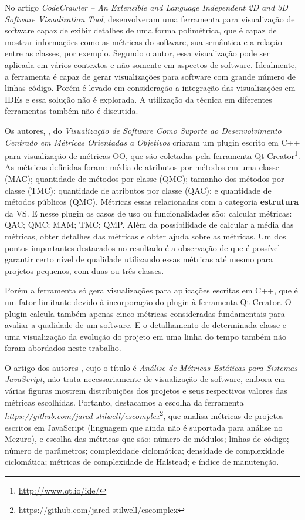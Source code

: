 No artigo \textit{CodeCrawler – An Extensible and Language Independent 2D and
3D Software Visualization Tool}, 
desenvolveram uma ferramenta para visualização de software capaz de exibir
detalhes de uma forma polimétrica, que é capaz de mostrar informações como as
métricas do software, sua semântica e a relação entre as classes, por exemplo.
Segundo o autor, essa visualização pode ser aplicada em vários contextos e não
somente em aspectos de software. Idealmente, a ferramenta é capaz de gerar
visualizações para software com grande número de linhas código. Porém é levado
em consideração a integração das visualizações em IDEs e essa solução não é
explorada. A utilização da técnica em diferentes ferramentas também não é
discutida.

Os autores, , do \textit{Visualização de Software
Como Suporte ao Desenvolvimento Centrado em Métricas Orientadas a Objetivos}
criaram um plugin escrito em C++ para visualização de métricas OO, que são
coletadas pela ferramenta Qt Creator\footnote{\url{http://www.qt.io/ide/}}. As
métricas definidas foram: média de atributos por métodos em uma classe (MAC);
quantidade de métodos por classe (QMC); tamanho dos métodos por classe (TMC);
quantidade de atributos por classe (QAC); e quantidade de métodos públicos
(QMC). Métricas essas relacionadas com a categoria \textbf{estrutura} da VS.
E nesse plugin os casos de uso ou funcionalidades
são: calcular métricas: QAC; QMC; MAM; TMC; QMP. Além da
possibilidade de calcular a média das métricas, obter detalhes das métricas e
obter ajuda sobre as métricas. Um dos pontos importantes destacados no
resultado é a observação de que é possível garantir certo nível de qualidade
utilizando essas métricas até mesmo para projetos pequenos, com duas ou três
classes.

Porém a ferramenta só gera visualizações para aplicações escritas em C++, que é
um fator limitante devido à incorporação do plugin à ferramenta Qt Creator. O
plugin calcula também apenas cinco métricas consideradas fundamentais para
avaliar a qualidade de um software. E o detalhamento de determinada classe e
uma visualização da evolução do projeto em uma linha do tempo também não foram
abordados neste trabalho.

O artigo dos autores , cujo o título é \textit{Análise de
Métricas Estáticas para Sistemas JavaScript}, não trata necessariamente de
visualização de software, embora em várias figuras mostrem distribuições dos
projetos e seus respectivos valores das métricas escolhidas. Portanto,
destacamos a escolha da ferramenta
\textit{https://github.com/jared-stilwell/escomplex}\footnote{\url{https://github.com/jared-stilwell/escomplex}},
que analisa métricas de projetos escritos em JavaScript (linguagem que ainda
não é suportada para análise no Mezuro), e escolha das métricas que são: número
de módulos; linhas de código; número de parâmetros; complexidade ciclomática;
densidade de complexidade ciclomática; métricas de complexidade de Halstead; e
índice de manutenção.

